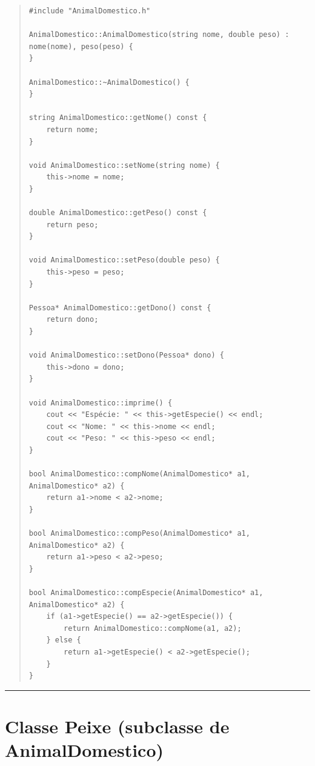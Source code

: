 \documentclass[12pt]{article}
\begin{document}
\begin{quote}
\begin{scriptsize}
\begin{verbatim}
#include "AnimalDomestico.h"

AnimalDomestico::AnimalDomestico(string nome, double peso) :
nome(nome), peso(peso) {
}

AnimalDomestico::~AnimalDomestico() {
}

string AnimalDomestico::getNome() const {
    return nome;
}

void AnimalDomestico::setNome(string nome) {
    this->nome = nome;
}

double AnimalDomestico::getPeso() const {
    return peso;
}

void AnimalDomestico::setPeso(double peso) {
    this->peso = peso;
}

Pessoa* AnimalDomestico::getDono() const {
    return dono;
}

void AnimalDomestico::setDono(Pessoa* dono) {
    this->dono = dono;
}

void AnimalDomestico::imprime() {
    cout << "Espécie: " << this->getEspecie() << endl;
    cout << "Nome: " << this->nome << endl;
    cout << "Peso: " << this->peso << endl;
}

bool AnimalDomestico::compNome(AnimalDomestico* a1, AnimalDomestico* a2) {
    return a1->nome < a2->nome;
}

bool AnimalDomestico::compPeso(AnimalDomestico* a1, AnimalDomestico* a2) {
    return a1->peso < a2->peso;
}

bool AnimalDomestico::compEspecie(AnimalDomestico* a1, AnimalDomestico* a2) {
    if (a1->getEspecie() == a2->getEspecie()) {
        return AnimalDomestico::compNome(a1, a2);
    } else {
        return a1->getEspecie() < a2->getEspecie();
    }
}
\end{verbatim}
\end{scriptsize}
\end{quote}

\par\noindent\rule{\textwidth}{0.4pt}

\newpage

\section*{Classe {\sf Peixe} (subclasse de {\sf AnimalDomestico})}
\end{document}
